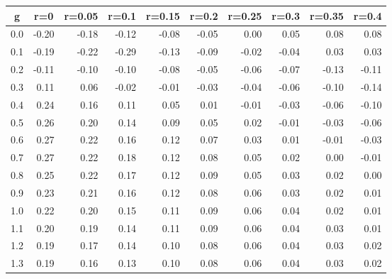 %
\begin{table}[!tbp]
 \begin{center}
 \begin{tabular}{rrrrrrrrrr}\hline\hline
\multicolumn{1}{c}{g}&\multicolumn{1}{c}{r=0}&\multicolumn{1}{c}{r=0.05}&\multicolumn{1}{c}{r=0.1}&\multicolumn{1}{c}{r=0.15}&\multicolumn{1}{c}{r=0.2}&\multicolumn{1}{c}{r=0.25}&\multicolumn{1}{c}{r=0.3}&\multicolumn{1}{c}{r=0.35}&\multicolumn{1}{c}{r=0.4}\tabularnewline
\hline
0.0&-0.20&-0.18&-0.12&-0.08&-0.05& 0.00& 0.05& 0.08& 0.08\tabularnewline
0.1&-0.19&-0.22&-0.29&-0.13&-0.09&-0.02&-0.04& 0.03& 0.03\tabularnewline
0.2&-0.11&-0.10&-0.10&-0.08&-0.05&-0.06&-0.07&-0.13&-0.11\tabularnewline
0.3& 0.11& 0.06&-0.02&-0.01&-0.03&-0.04&-0.06&-0.10&-0.14\tabularnewline
0.4& 0.24& 0.16& 0.11& 0.05& 0.01&-0.01&-0.03&-0.06&-0.10\tabularnewline
0.5& 0.26& 0.20& 0.14& 0.09& 0.05& 0.02&-0.01&-0.03&-0.06\tabularnewline
0.6& 0.27& 0.22& 0.16& 0.12& 0.07& 0.03& 0.01&-0.01&-0.03\tabularnewline
0.7& 0.27& 0.22& 0.18& 0.12& 0.08& 0.05& 0.02& 0.00&-0.01\tabularnewline
0.8& 0.25& 0.22& 0.17& 0.12& 0.09& 0.05& 0.03& 0.02& 0.00\tabularnewline
0.9& 0.23& 0.21& 0.16& 0.12& 0.08& 0.06& 0.03& 0.02& 0.01\tabularnewline
1.0& 0.22& 0.20& 0.15& 0.11& 0.09& 0.06& 0.04& 0.02& 0.01\tabularnewline
1.1& 0.20& 0.19& 0.14& 0.11& 0.09& 0.06& 0.04& 0.03& 0.01\tabularnewline
1.2& 0.19& 0.17& 0.14& 0.10& 0.08& 0.06& 0.04& 0.03& 0.02\tabularnewline
1.3& 0.19& 0.16& 0.13& 0.10& 0.08& 0.06& 0.04& 0.03& 0.02\tabularnewline
\hline
\end{tabular}

\end{center}

\end{table}

